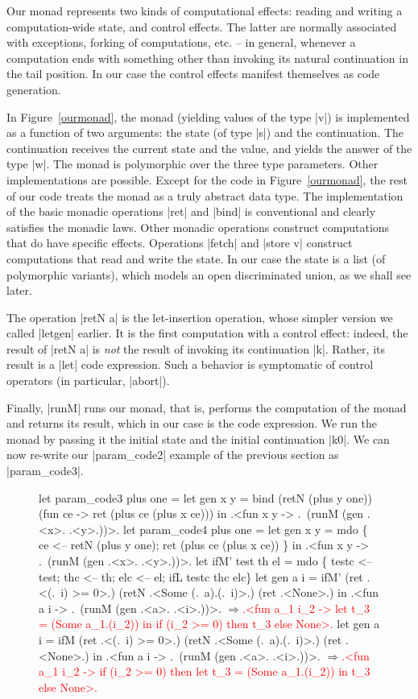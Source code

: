 \documentclass{llncs}
\newcommand{\evalresult}[1]{\ensuremath{\Longrightarrow}\textcolor{red}{#1}}
\begin{document}
Our monad represents two kinds of computational effects: reading and
writing a computation-wide state, and control effects. The latter are
normally associated with exceptions, forking of computations, etc. --
in general, whenever a computation ends with something other than
invoking its natural continuation in the tail position. In our case
the control effects manifest themselves as code generation.

In Figure~\ref{ourmonad}, the monad (yielding values of the type |v|)
is implemented as a function of two
arguments: the state (of type |s|) and the continuation. The
continuation receives the current state and the value, and
yields the answer of the type |w|.  The monad is polymorphic over the
three type parameters.  Other implementations are
possible. Except for the code in Figure~\ref{ourmonad}, the rest of our code
treats the monad as a truly abstract data type. The implementation of
the basic
monadic operations |ret| and |bind| is conventional and clearly
satisfies the monadic laws. Other monadic operations
construct computations that do have specific effects.  Operations |fetch| and
|store v| construct computations that read and write the state. In our
case the state is a list (of polymorphic variants), which models an
open discriminated union, as we shall see later.

The operation |retN a| is the let-insertion operation, whose simpler
version we called |letgen| earlier. It is the first computation with
a control effect: indeed, the result of |retN a| is \emph{not} the
result of invoking its continuation |k|. Rather, its result is a |let|
code expression. Such a behavior is symptomatic of control operators
(in particular, |abort|).

Finally, |runM| runs our monad, that is, performs the computation of
the monad and returns its result, which in our case is the code
expression. We run the monad by passing it the initial state and the
initial continuation |k0|. We can now re-write our |param_code2|
example of the previous section as |param_code3|.

\begin{figure}
\begin{code}
let param_code3 plus one =
  let gen x y = bind (retN (plus y one)) (fun ce -> 
                ret (plus ce (plus x ce)))
  in .<fun x y -> .~(runM (gen .<x>. .<y>.))>.
let param_code4 plus one =
  let gen x y = mdo \{ ce <-- retN (plus y one);
                      ret (plus ce (plus x ce)) \}
  in .<fun x y -> .~(runM (gen .<x>. .<y>.))>.
let ifM' test th el = mdo \{
  testc <-- test; thc <-- th; elc <-- el;
  ifL testc thc elc\}
let gen a i = ifM' (ret .<(.~i) >= 0>.) 
                   (retN .<Some (.~a).(.~i)>.) (ret .<None>.)
 in .<fun a i -> .~(runM (gen .<a>. .<i>.))>.
\evalresult{.<fun a_1 i_2 -> \protect\newline
let t_3 = (Some a_1.(i_2)) in if (i_2 >= 0) then t_3 else None>.}
let gen a i = ifM (ret .<(.~i) >= 0>.) 
                  (retN .<Some (.~a).(.~i)>.) (ret .<None>.)
 in .<fun a i -> .~(runM (gen .<a>. .<i>.))>.
\evalresult{.<fun a_1 i_2 -> 
if (i_2 >= 0) then let t_3 = (Some a_1.(i_2)) in t_3 else None>.}
\end{code}
\end{figure}
\end{document}
